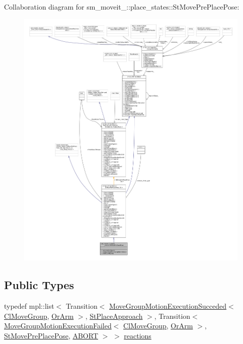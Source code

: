 Collaboration diagram for sm\+\_\+moveit\+\_\+:\+:place\+\_\+states\+:\+:St\+Move\+Pre\+Place\+Pose\+:
\nopagebreak
\begin{figure}[H]
\begin{center}
\leavevmode
\includegraphics[width=350pt]{structsm__moveit__3_1_1place__states_1_1StMovePrePlacePose__coll__graph}
\end{center}
\end{figure}
\subsection*{Public Types}
\begin{DoxyCompactItemize}
\item 
typedef mpl\+::list$<$ Transition$<$ \hyperlink{structmove__group__interface__client_1_1MoveGroupMotionExecutionSucceded}{Move\+Group\+Motion\+Execution\+Succeded}$<$ \hyperlink{classmove__group__interface__client_1_1ClMoveGroup}{Cl\+Move\+Group}, \hyperlink{classsm__moveit__3_1_1OrArm}{Or\+Arm} $>$, \hyperlink{structsm__moveit__3_1_1place__states_1_1StPlaceApproach}{St\+Place\+Approach} $>$, Transition$<$ \hyperlink{structmove__group__interface__client_1_1MoveGroupMotionExecutionFailed}{Move\+Group\+Motion\+Execution\+Failed}$<$ \hyperlink{classmove__group__interface__client_1_1ClMoveGroup}{Cl\+Move\+Group}, \hyperlink{classsm__moveit__3_1_1OrArm}{Or\+Arm} $>$, \hyperlink{structsm__moveit__3_1_1place__states_1_1StMovePrePlacePose}{St\+Move\+Pre\+Place\+Pose}, \hyperlink{classABORT}{A\+B\+O\+RT} $>$ $>$ \hyperlink{structsm__moveit__3_1_1place__states_1_1StMovePrePlacePose_ad37831708e351f14da0a830f0a115f2c}{reactions}
\end{DoxyCompactItemize}
